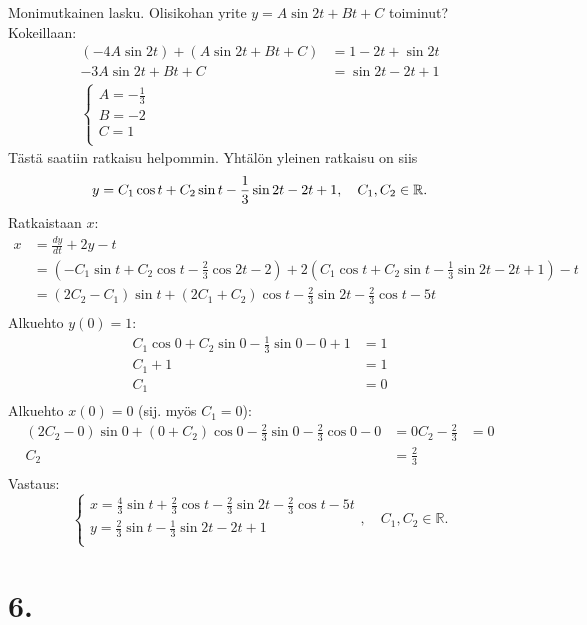\documentclass{article}
\begin{document}
Monimutkainen lasku. Olisikohan yrite $y = A\sin 2t + Bt + C$ toiminut?
Kokeillaan:
\begin{align*}
  (-4A\sin 2t) + (A\sin 2t + Bt + C) &= 1 - 2t + \sin 2t \\
  -3A\sin 2t + Bt + C &= \sin 2t - 2t + 1 \\
  \begin{cases}
    A = -\frac{1}{3} \\
    B = -2 \\
    C = 1 \\
  \end{cases}
\end{align*}
Tästä saatiin ratkaisu helpommin. Yhtälön yleinen ratkaisu on siis
\[
  y = C_1\cos t + C_2\sin t -\frac{1}{3}\sin 2t - 2t + 1, \quad C_1,C_2 \in \mathbb{R}. \\
\]
Ratkaistaan $x$:
\begin{align*}
  x &= \frac{dy}{dt} + 2y - t \\
    &= (-C_1\sin t + C_2\cos t - \frac{2}{3}\cos 2t - 2)
    + 2(C_1\cos t + C_2\sin t - \frac{1}{3}\sin 2t - 2t + 1)
     - t \\
    &= (2C_2 - C_1)\sin t + (2C_1 + C_2)\cos t - \frac{2}{3}\sin 2t - \frac{2}{3}\cos t - 5t \\
\end{align*}
Alkuehto $y(0) = 1$:
\begin{align*}
  C_1\cos 0 + C_2\sin 0 -\frac{1}{3}\sin 0 - 0 + 1 &= 1 \\
  C_1 + 1 &= 1 \\
  C_1 &= 0 \\
\end{align*}
Alkuehto $x(0) = 0$ (sij. myös $C_1 = 0$):
\begin{align*}
  (2C_2 - 0)\sin 0 + (0 + C_2)\cos 0 - \frac{2}{3}\sin 0 - \frac{2}{3}\cos 0 - 0 &= 0
  C_2 - \frac{2}{3} &= 0 \\
  C_2 &= \frac{2}{3} \\
\end{align*}
Vastaus:
\[
  \begin{cases}
    x = \frac{4}{3}\sin t + \frac{2}{3}\cos t - \frac{2}{3}\sin 2t - \frac{2}{3}\cos t - 5t \\
    y = \frac{2}{3}\sin t - \frac{1}{3}\sin 2t - 2t + 1 \\
  \end{cases}, \quad C_1,C_2 \in \mathbb{R}.
\]

\section*{6.}
\end{document}
